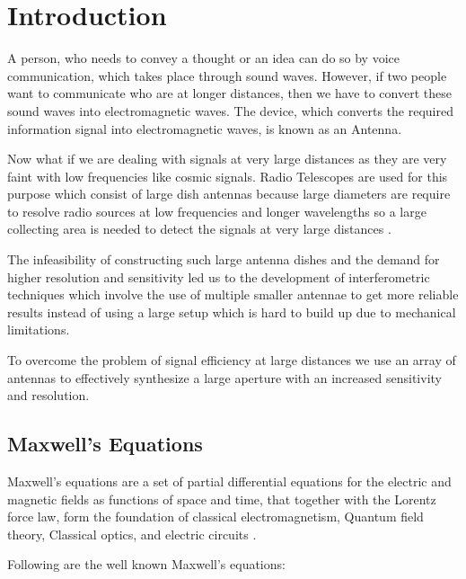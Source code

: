 \chapter{Introduction}

A person, who needs to convey a thought or an idea can do so by voice communication, which takes place through sound waves. However, if two people want to communicate who are at longer distances, then we have to convert these sound waves into electromagnetic waves. The device, which converts the required information signal into electromagnetic waves, is known as an Antenna.

Now what if we are dealing with signals at very large distances as they are very faint with low frequencies like cosmic signals. Radio Telescopes are used for this purpose which consist of large dish antennas because large diameters are require to resolve radio sources at low frequencies and longer wavelengths so a large collecting area is needed to detect the signals at very large distances \cite{christiansen1987radiotelescopes}.

The infeasibility of constructing such large antenna dishes and the demand for higher resolution and sensitivity led us to the development of interferometric techniques which involve the use of multiple smaller antennae to get more reliable results instead of using a large setup which is hard to build up due to mechanical limitations.

To overcome the problem of signal efficiency at large distances we use an array of antennas to effectively synthesize a large aperture with an increased sensitivity and resolution.
 

\section{Maxwell's Equations}

Maxwell's equations are a set of partial differential equations for the electric and magnetic fields as functions of space and time, that together with the Lorentz force law, form the foundation of classical electromagnetism, Quantum field theory, Classical optics, and electric circuits \cite{griffiths1962introduction}.

Following are the well known Maxwell's equations:

